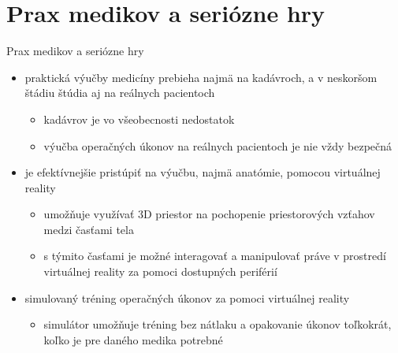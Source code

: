 \documentclass[10pt]{beamer}
\begin{document}
\section{Prax medikov a seriózne hry}
    \begin{frame}{Prax medikov a seriózne hry}
  \begin{itemize}
  \setlength\itemsep{2em}
\item praktická výučby medicíny prebieha najmä na kadávroch, a v neskoršom štádiu štúdia aj na reálnych pacientoch
	\begin{itemize}
	\item kadávrov je vo všeobecnosti nedostatok
	\item výučba operačných úkonov na reálnych pacientoch je nie vždy bezpečná
	\end{itemize}
	
\item je efektívnejšie pristúpiť na výučbu, najmä anatómie, pomocou virtuálnej reality
	\begin{itemize}
	\item umožňuje využívať 3D priestor na pochopenie priestorových vzťahov medzi časťami tela
	\item s týmito časťami je možné interagovať a manipulovať práve v prostredí virtuálnej reality za pomoci dostupných periférií
	\end{itemize}
	
\item simulovaný tréning operačných úkonov za pomoci virtuálnej reality
	\begin{itemize}
	\item simulátor umožňuje tréning bez nátlaku a opakovanie úkonov toľkokrát, koľko je pre daného medika potrebné

	\end{itemize}
\end{itemize}
    \end{frame}
\end{document}
